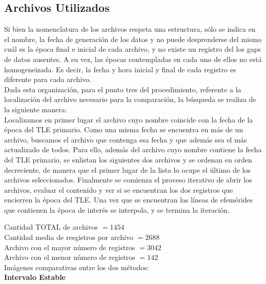 \subsection*{Archivos Utilizados}
Si bien la nomenclatura de los archivos respeta una estructura, s\'olo se indica en el nombre, la fecha de generaci\'on de los datos y no puede desprenderse del mismo cu\'al es la \'epoca final e inicial de cada archivo, y no existe un registro del los gaps de datos ausentes. A su vez, las \'epocas contempladas en cada uno de ellos no está homogeneizada. Es decir, la fecha y hora inicial y final de cada registro es diferente para cada archivo.\\
Dada esta organizaci\'on, para el punto tres del procedimiento, referente a la localizaci\'on del archivo necesario para la comparaci\'on, la b\'usqueda se realiza de la siguiente manera:\\
Localizamos en primer lugar el archivo cuyo nombre coincide con la fecha de la \'epoca del TLE primario.
Como una misma fecha se encuentra en m\'as de un archivo, buscamos el archivo que contenga esa fecha y que adem\'as sea el m\'as actualizado de todos. Para ello, además del archivo cuyo nombre contiene la fecha del TLE primario, se enlistan los siguientes dos archivos y se ordenan en orden decreciente, de manera que el primer lugar de la lista lo ocupe el \'ultimo de los archivos seleccionados. Finalmente se comienza el proceso iterativo de abrir los archivos, evaluar el contenido y ver si se encuentran los dos registros que encierren la \'epoca del TLE.
Una vez que se encuentran las l\'ineas de efem\'erides que contienen la \'epoca de inter\'es se interpola, y se termina la iteraci\'on.

\noindent
Cantidad TOTAL de archivos $=  1454$\\
Cantidad media de resgistros por archivo $=  2688$\\
Archivo con el mayor n\'umero de registros $=  3042$\\
Archivo con el menor n\'umero de registros $=  142$\\

Im\'agenes comparativas entre los dos m\'etodos:\\
{\bf{Intervalo Estable}}\\


